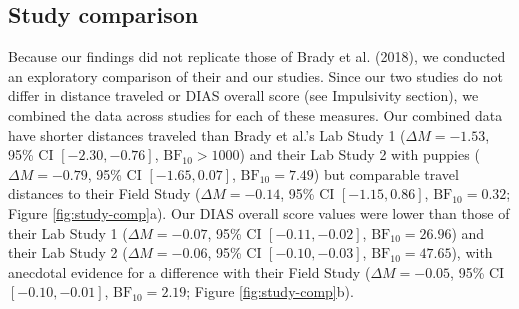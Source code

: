 \documentclass[
  pub,floatsintext]{apa6}
\begin{document}
\hypertarget{study-comparison}{%
\subsection{Study comparison}\label{study-comparison}}

Because our findings did not replicate those of Brady et al. (2018), we conducted an exploratory comparison of their and our studies. Since our two studies do not differ in distance traveled or DIAS overall score (see Impulsivity section), we combined the data across studies for each of these measures. Our combined data have shorter distances traveled than Brady et al.'s Lab Study 1 (\(\Delta M = -1.53\), 95\% CI \([-2.30, -0.76]\), \(\mathrm{BF}_{\textrm{10}} > 1000\)) and their Lab Study 2 with puppies (\(\Delta M = -0.79\), 95\% CI \([-1.65, 0.07]\), \(\mathrm{BF}_{\textrm{10}} = 7.49\)) but comparable travel distances to their Field Study (\(\Delta M = -0.14\), 95\% CI \([-1.15, 0.86]\), \(\mathrm{BF}_{\textrm{10}} = 0.32\); Figure \ref{fig:study-comp}a). Our DIAS overall score values were lower than those of their Lab Study 1 (\(\Delta M = -0.07\), 95\% CI \([-0.11, -0.02]\), \(\mathrm{BF}_{\textrm{10}} = 26.96\)) and their Lab Study 2 (\(\Delta M = -0.06\), 95\% CI \([-0.10, -0.03]\), \(\mathrm{BF}_{\textrm{10}} = 47.65\)), with anecdotal evidence for a difference with their Field Study (\(\Delta M = -0.05\), 95\% CI \([-0.10, -0.01]\), \(\mathrm{BF}_{\textrm{10}} = 2.19\); Figure \ref{fig:study-comp}b).
\end{document}
